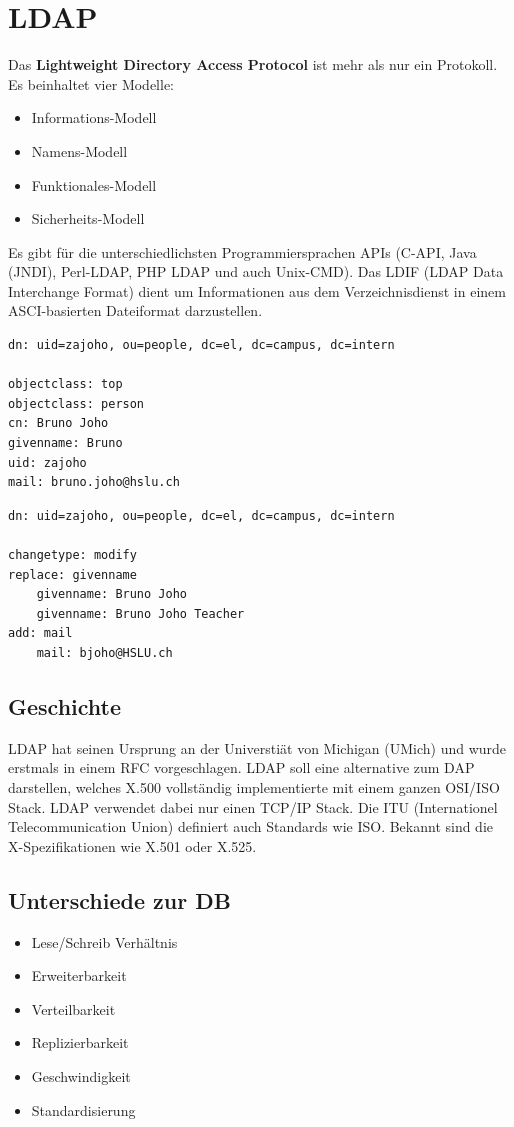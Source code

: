 \section{LDAP}
Das \textbf{Lightweight Directory Access Protocol} ist mehr als nur ein Protokoll. Es beinhaltet vier Modelle:
\begin{itemize}
	\item Informations-Modell
	\item Namens-Modell
	\item Funktionales-Modell
	\item Sicherheits-Modell
\end{itemize}
Es gibt für die unterschiedlichsten Programmiersprachen APIs (C-API, Java (JNDI), Perl-LDAP, PHP LDAP und auch Unix-CMD). Das LDIF (LDAP Data Interchange Format) dient um Informationen aus dem Verzeichnisdienst in einem ASCI-basierten Dateiformat darzustellen.


\begin{lstlisting}[caption=Beispiel LDIF]
dn: uid=zajoho, ou=people, dc=el, dc=campus, dc=intern

objectclass: top
objectclass: person
cn: Bruno Joho
givenname: Bruno
uid: zajoho
mail: bruno.joho@hslu.ch
\end{lstlisting}


\begin{lstlisting}[caption=Beispiel LDIF Update]
dn: uid=zajoho, ou=people, dc=el, dc=campus, dc=intern

changetype: modify
replace: givenname
	givenname: Bruno Joho
	givenname: Bruno Joho Teacher
add: mail
	mail: bjoho@HSLU.ch
\end{lstlisting}

\subsection{Geschichte}
LDAP hat seinen Ursprung an der Universtiät von Michigan (UMich) und wurde erstmals in einem RFC vorgeschlagen. LDAP soll eine alternative zum DAP darstellen, welches X.500 vollständig implementierte mit einem ganzen OSI/ISO Stack. LDAP verwendet dabei nur einen TCP/IP Stack. Die ITU (Internationel Telecommunication Union) definiert auch Standards wie ISO. Bekannt sind die X-Spezifikationen wie X.501 oder X.525.

\subsection{Unterschiede zur DB}
\begin{itemize}
	\item Lese/Schreib Verhältnis
	\item Erweiterbarkeit
	\item Verteilbarkeit
	\item Replizierbarkeit
	\item Geschwindigkeit
	\item Standardisierung 
\end{itemize}

